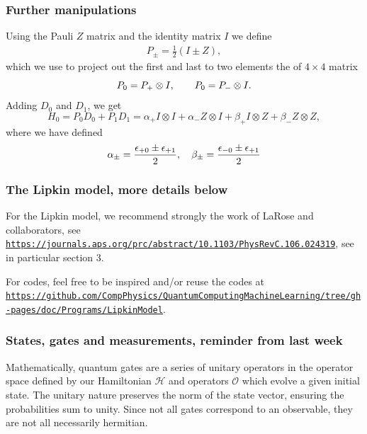 \documentclass{beamer}
\begin{document}
\begin{frame}
\frametitle{Further manipulations}

Using the Pauli $Z$ matrix and the identity matrix $I$ we define
\begin{align*}
    P_{\pm} = \frac{1}{2}(I \pm Z),
\end{align*}
which we use to project out the first and last to two elements the of $4\times 4$ matrix
\[
    P_0 = P_+ \otimes I,\hspace{20px}P_0 = P_- \otimes I.
\]
Adding $D_0$ and $D_1$, we get
\[
    H_0 = P_0 D_0 + P_1 D_1= \alpha_+ I \otimes I + \alpha_- Z \otimes I + \beta_+ I \otimes Z + \beta_- Z \otimes Z, 
\]
where we have defined
\[
    \alpha_\pm = \frac{\epsilon_{+0}\pm\epsilon_{+1}}{2}, \hspace{10px} \beta_\pm = \frac{\epsilon_{-0}\pm\epsilon_{+1}}{2}
\]
\end{frame}

\begin{frame}
\frametitle{The Lipkin model, more details below}

For the Lipkin model, we recommend strongly the work of LaRose and collaborators, see
\href{{https://journals.aps.org/prc/abstract/10.1103/PhysRevC.106.024319}}{\nolinkurl{https://journals.aps.org/prc/abstract/10.1103/PhysRevC.106.024319}}, see in particular section 3.

For codes, feel free to be inspired and/or reuse the codes at \href{{https://github.com/CompPhysics/QuantumComputingMachineLearning/tree/gh-pages/doc/Programs/LipkinModel}}{\nolinkurl{https://github.com/CompPhysics/QuantumComputingMachineLearning/tree/gh-pages/doc/Programs/LipkinModel}}.
\end{frame}

\begin{frame}
\frametitle{States, gates and measurements, reminder from last week}

Mathematically, quantum gates are a series of unitary operators in the
operator space defined by our Hamiltonian $\mathcal{H}$ and operators $\mathcal{O}$ which evolve a given initial
state. The unitary nature preserves the norm of the state vector,
ensuring the probabilities sum to unity. Since not all gates
correspond to an observable, they are not all necessarily hermitian.
\end{frame}
\end{document}
